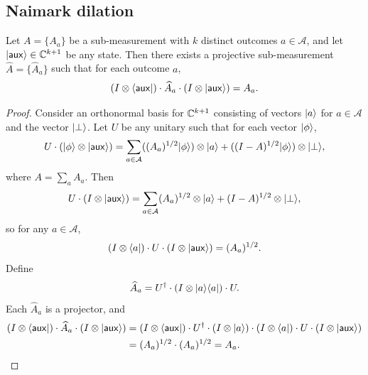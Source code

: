 \subsection{Naimark dilation}\label{sec:naimark}

\begin{lemma}\label{lem:naimark-helper}
	\leanok
	Let $A = \{A_a\}$ be a sub-measurement with $k$ distinct outcomes $a \in \mathcal A$, and let $\lvert \mathsf{aux} \rangle \in \mathbb{C}^{k+1}$ be any state. Then there exists a projective sub-measurement $\widehat{A} = \{\widehat{A}_a\}$ such that for each outcome $a$,
	\[
		(I \otimes \langle \mathsf{aux} \rvert) \cdot \widehat{A}_a \cdot (I \otimes \lvert \mathsf{aux} \rangle)
		=
		A_a.
	\]
\end{lemma}
\begin{proof}
	\leanok
	Consider an orthonormal basis for $\mathbb{C}^{k+1}$ consisting of vectors $\lvert a \rangle$ for $a \in \mathcal A$ and the vector $\lvert \bot \rangle$. Let $U$ be any unitary such that for each vector $\lvert \phi \rangle$,
	\[
		U \cdot (\lvert \phi \rangle \otimes \lvert \mathsf{aux} \rangle)
		=
		\sum_{a \in \mathcal A} ((A_a)^{1/2}\lvert \phi \rangle) \otimes \lvert a \rangle
		+
		((I-A)^{1/2}\lvert \phi \rangle) \otimes \lvert \bot \rangle,
	\]
	where $A=\sum_a A_a$. Then
	\[
		U \cdot (I \otimes \lvert \mathsf{aux} \rangle)
		=
		\sum_{a \in \mathcal A} (A_a)^{1/2} \otimes \lvert a \rangle
		+
		(I-A)^{1/2} \otimes \lvert \bot \rangle,
	\]
	so for any $a \in \mathcal A$,
	\[
		(I \otimes \langle a \rvert) \cdot U \cdot (I \otimes \lvert \mathsf{aux} \rangle)
		=
		(A_a)^{1/2}.
	\]
	Define
	\[
		\widehat{A}_a = U^\dagger \cdot (I \otimes \lvert a \rangle\langle a \rvert) \cdot U.
	\]
	Each $\widehat{A}_a$ is a projector, and
	\begin{align*}
		(I \otimes \langle \mathsf{aux} \rvert) \cdot \widehat{A}_a \cdot (I \otimes \lvert \mathsf{aux} \rangle)
		 & =
		(I \otimes \langle \mathsf{aux} \rvert) \cdot U^\dagger \cdot (I \otimes \lvert a \rangle) \cdot (I \otimes \langle a \rvert) \cdot U \cdot (I \otimes \lvert \mathsf{aux} \rangle) \\
		 & =
		(A_a)^{1/2} \cdot (A_a)^{1/2}
		=
		A_a.
	\end{align*}
\end{proof}

